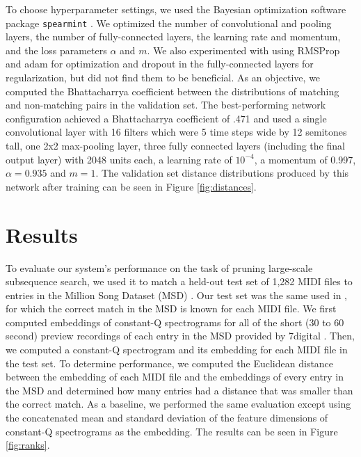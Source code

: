 \documentclass{article}
\begin{document}
To choose hyperparameter settings, we used the Bayesian optimization software package \texttt{spearmint} \cite{snoek2012practical}.
We optimized the number of convolutional and pooling layers, the number of fully-connected layers, the learning rate and momentum, and the loss parameters $\alpha$ and $m$.
We also experimented with using RMSProp \cite{tieleman2012lecture} and adam \cite{kingma2014adam} for optimization and dropout \cite{hinton2012improving} in the fully-connected layers for regularization, but did not find them to be beneficial.
As an objective, we computed the Bhattacharrya coefficient \cite{bhattacharyya1943measure} between the distributions of matching and non-matching pairs in the validation set.
The best-performing network configuration achieved a Bhattacharrya coefficient of .471 and used a single convolutional layer with 16 filters which were 5 time steps wide by 12 semitones tall, one 2x2 max-pooling layer, three fully connected layers (including the final output layer) with 2048 units each, a learning rate of $10^{-4}$, a momentum of 0.997, $\alpha = 0.935$ and $m = 1$.
The validation set distance distributions produced by this network after training can be seen in Figure \ref{fig:distances}.

\section{Results}
\label{sec:results}

To evaluate our system's performance on the task of pruning large-scale subsequence search, we used it to match a held-out test set of 1,282 MIDI files to entries in the Million Song Dataset (MSD) \cite{bertin2011million}.
Our test set was the same used in \cite{raffel2015large}, for which the correct match in the MSD is known for each MIDI file.
We first computed embeddings of constant-Q spectrograms for all of the short (30 to 60 second) preview recordings of each entry in the MSD provided by 7digital \cite{schindler2012facilitating}.
Then, we computed a constant-Q spectrogram and its embedding for each MIDI file in the test set.
To determine performance, we computed the Euclidean distance between the embedding of each MIDI file and the embeddings of every entry in the MSD and determined how many entries had a distance that was smaller than the correct match.
As a baseline, we performed the same evaluation except using the concatenated mean and standard deviation of the feature dimensions of constant-Q spectrograms as the embedding.
The results can be seen in Figure \ref{fig:ranks}.
\end{document}
